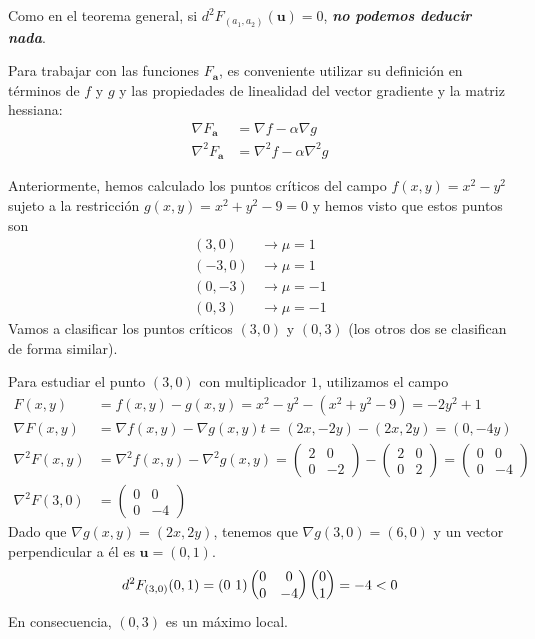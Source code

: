 Como en el teorema general, si $d^2F_{(a_1,a_2)}(\boldsymbol{u})=0$, {\bf\em no podemos deducir nada}.

Para trabajar con las funciones $F_{\boldsymbol a}$, es conveniente utilizar su definición en términos de $f$ y $g$ y las propiedades de linealidad del vector gradiente y la matriz hessiana:
\begin{align*}
\nabla F_{\boldsymbol a} & = \nabla f -\alpha\nabla g \\
\nabla^2 F_{\boldsymbol a} & = \nabla^2 f -\alpha\nabla^2 g
\end{align*}

\begin{ejemplo}
Anteriormente, hemos calculado los puntos críticos del campo $f(x,y)=x^2-y^2$ sujeto a la restricción 
$g(x,y)=x^2+y^2-9=0$ y hemos visto que estos puntos son 
\begin{align*}
(3,0) &\to \mu =1\\
(-3,0) &\to  \mu =1\\
(0,-3) &\to  \mu =-1\\
(0,3) &\to  \mu =-1
\end{align*}
Vamos a clasificar los puntos críticos $(3,0)$ y $(0,3)$ (los otros dos se clasifican de forma similar).

Para estudiar el punto $(3,0)$ con multiplicador $1$, utilizamos el campo
\begin{align*}
F(x,y)&=f(x,y)-g(x,y)=x^2-y^2-(x^2+y^2-9)=-2y^2+1\\
\nabla F(x,y)&=\nabla f(x,y) -\nabla g(x,y)t=(2x,-2y)-(2x,2y)=
(0, -4y)\\
\nabla^2 F(x,y)&=
\nabla^2 f(x,y) -\nabla^2 g(x,y)=
\begin{pmatrix}
2 & 0\\
0 & -2
\end{pmatrix}-
\begin{pmatrix}
2 & 0\\
0 & 2
\end{pmatrix}=
\begin{pmatrix}
0 & 0\\
0 & -4
\end{pmatrix}\\
\nabla^2 F(3,0)&=
\begin{pmatrix}
0 & 0\\
0 & -4
\end{pmatrix}
\end{align*}
Dado que $\nabla g(x,y)=(2x,2y)$, tenemos que $\nabla g(3,0)=(6,0)$ y un vector perpendicular a él es $\boldsymbol u=(0,1)$.
\[
d^2F_{(3,0)}(0,1)=(0\ 1)
\begin{pmatrix}
0 & 0\\
0 & -4
\end{pmatrix}
\begin{pmatrix}
0\\
1 
\end{pmatrix} = -4 < 0
\]
En consecuencia, $(0,3)$ es un máximo local.


\end{ejemplo}

